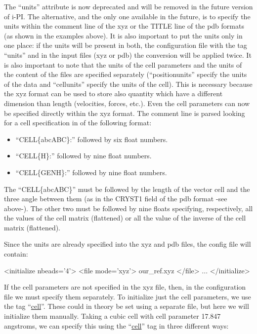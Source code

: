 \documentclass[11pt,english,fleqn]{report}
\newenvironment{code}{%
\footnotesize 
\verbatim
}{
\endverbatim
\normalsize
}
\begin{document}
The {}``units'' attribute is now deprecated and will be removed in the
future version of i-PI. The alternative, and the only one available in
the future, is to specify the units within the comment line of the xyz
or the TITLE line of the pdb formats (as shown in the examples
above). It is also important to put the units only in one place: if
the units will be present in both, the configuration file with the tag
{}``units'' and in the input files (xyz or pdb) the conversion will be
applied twice. It is also important to note that the units of the cell
parameters and the units of the content of the files are specified
separately ({}``position{units}'' specify the units of the data and
{}``cell{units}'' specify the units of the cell). This is necessary
because the xyz format can be used to 
store also quantity which have a different dimension than length
(velocities, forces, etc.). Even the cell parameters can now be specified
directly within the xyz format. The comment line is parsed looking for
a cell specification in of the following format:
\begin{itemize}
\item ``CELL\{abcABC\}:'' followed by six float numbers.
\item ``CELL\{H\}:'' followed by nine float numbers.
\item ``CELL\{GENH\}:'' followed by nine float numbers.
\end{itemize}
The {}``CELL\{abcABC\}'' must be followed by the length of the vector
cell and the three angle between them (as in the CRYST1 field of the
pdb format -see above-). The other two must be followed
by nine floats specifying, respectively, all the values of the cell
matrix (flattened) or all the value of the inverse of the cell matrix
(flattened).

Since the units are already specified into the xyz and pdb files, the
config file will contain:

\begin{code}
<initialize nbeads='4'>
   <file mode='xyz'> our_ref.xyz </file>
   ...
</initialize>
\end{code}

If the cell parameters are not specified in the xyz file, then, in the 
configuration file we must specify them separately. 
To initialize just the cell parameters, 
we use the tag {}``\hyperref[INITCELL]{cell}''.
These could in theory be set using a separate
file, but here we will initialize them manually. Taking a cubic cell
with cell parameter 17.847 angstroms, we can specify this using
the {}``\hyperref[INITCELL]{cell}'' tag in three different ways:
\end{document}
